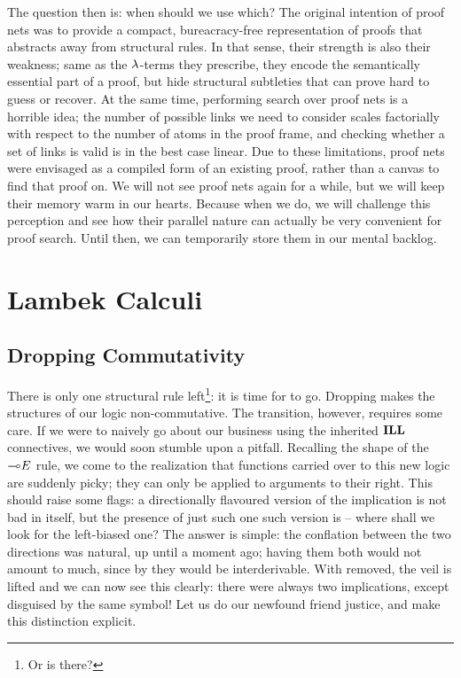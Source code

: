 The question then is: when should we use which?
The original intention of proof nets was to provide a compact, bureacracy-free representation of proofs that abstracts away from structural rules.
In that sense, their strength is also their weakness; same as the $\mathnormal{\lambda}$-terms they prescribe, they encode the semantically essential part of a proof, but hide structural subtleties that can prove hard to guess or recover.
At the same time, performing search over proof nets is a horrible idea; the number of possible links we need to consider scales factorially with respect to the number of atoms in the proof frame, and checking whether a set of links is valid is in the best case linear.
Due to these limitations, proof nets were envisaged as a compiled form of an existing proof, rather than a canvas to find that proof on.
We will not see proof nets again for a while, but we will keep their memory warm in our hearts.
Because when we do, we will challenge this perception and see how their parallel nature can actually be very convenient for proof search.
Until then, we can temporarily store them in our mental backlog. 


\section{Lambek Calculi}\label{section:lambek_calculi}
\subsection{Dropping Commutativity}
There is only one structural rule left\footnote{Or is there?}: it is time for \Exchange{} to go.
Dropping \Exchange{} makes the structures of our logic non-commutative.
The transition, however, requires some care.
If we were to naively go about our business using the inherited $\textbf{ILL}$ connectives, we would soon stumble upon a pitfall.
Recalling the shape of the $\li E$ rule, we come to the realization that functions carried over to this new logic are suddenly picky; they can only be applied to arguments to their right.
This should raise some flags: a directionally flavoured version of the implication is not bad in itself, but the presence of just such one such version is --  where shall we look for the left-biased one?
The answer is simple: the conflation between the two directions was natural, up until a moment ago; having them both would not amount to much, since by \Exchange{} they would be interderivable.
With \Exchange{} removed, the veil is lifted and we can now see this clearly: there were always two implications, except disguised by the same symbol!
Let us do our newfound friend justice, and make this distinction explicit.

